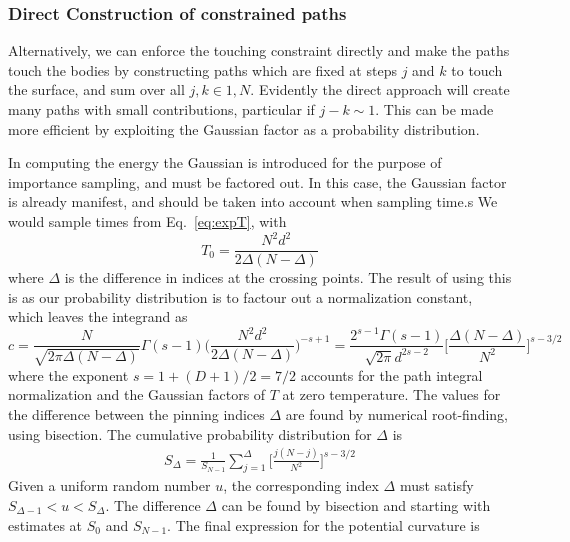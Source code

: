 \subsubsection{Direct Construction of constrained paths}

Alternatively,  we can enforce the touching constraint directly and make the paths touch the bodies by constructing
paths which are fixed at steps $j$ and $k$ to touch the surface, and sum over all $j,k\in {1,N}$.  
Evidently the direct approach will create many paths with small contributions, particular if $j-k \sim 1$.
This can be made more efficient by exploiting the Gaussian factor as a probability distribution.

In computing the energy the Gaussian is introduced for the purpose of importance sampling, and must
be factored out.  In this case, the Gaussian factor is already manifest, and should be taken into account
when sampling time.s   
We would sample times from Eq.~\ref{eq:expT}, with 
\begin{equation}
  T_0 = \frac{N^2d^2}{2\Delta(N-\Delta)} \label{eq:T0_curvature}
\end{equation}
where $\Delta$ is the difference in indices at the crossing points.
The result of using this is as our probability distribution is to factour out a normalization constant,
which leaves the integrand as 
\begin{equation}
  c=\frac{N}{\sqrt{2\pi\Delta(N-\Delta)}}\Gamma(s-1)\bigg(\frac{N^2d^2}{2\Delta(N-\Delta)}\bigg)^{-s+1}
    =\frac{2^{s-1}\Gamma(s-1)}{\sqrt{2\pi} d^{2s-2}}\bigg[\frac{\Delta(N-\Delta)}{N^2}\bigg]^{s-3/2}
\end{equation}
where the exponent $s=1+(D+1)/2=7/2$ accounts for the path integral normalization and the Gaussian factors of $T$ at
zero temperature.    
The values for the difference between the pinning indices $\Delta$ are found by numerical root-finding, using bisection.
The cumulative probability distribution for $\Delta$ is
\begin{gather}
 S_\Delta = \frac{1}{S_{N-1}}\sum_{j=1}^\Delta \bigg[\frac{j(N-j)}{N^2}\bigg]^{s-3/2}
\end{gather}
Given a uniform random number $u$, the corresponding index $\Delta$ must satisfy $S_{\Delta-1}<u<S_\Delta$.
The difference $\Delta$ can be found by bisection and starting with estimates at $S_0$ and $S_{N-1}$.
The final expression for the potential curvature is
